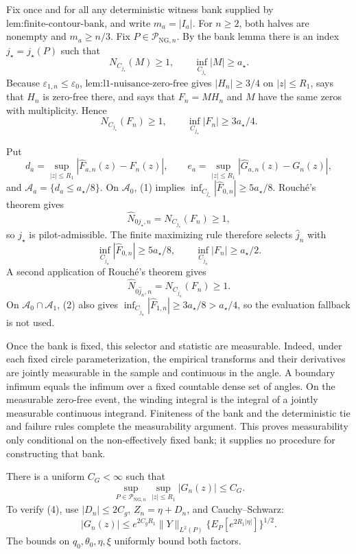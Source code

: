 Fix once and for all any deterministic witness bank supplied by \(\text{lem:finite-contour-bank}\), and write \(m_a=|I_a|\).  For \(n\ge2\), both halves are nonempty and \(m_a\ge n/3\).  Fix \(P\in\mathcal P_{\mathrm{NG},n}\).  By the bank lemma there is an index \(j_\star=j_\star(P)\) such that
\[
 N_{C_{j_\star}}(M)\ge1,
 \qquad \inf_{C_{j_\star}}|M|\ge a_\star.
\]
Because \(\varepsilon_{1,n}\le\varepsilon_0\), \(\text{lem:l1-nuisance-zero-free}\) gives \(|H_n|\ge3/4\) on \(|z|\le R_1\), says that \(H_n\) is zero-free there, and says that \(F_n=M H_n\) and \(M\) have the same zeros with multiplicity.  Hence
\[
 N_{C_{j_\star}}(F_n)\ge1,
 \qquad \inf_{C_{j_\star}}|F_n|\ge3a_\star/4. \tag{1}
\]

Put
\[
 d_a=\sup_{|z|\le R_1}|\widehat F_{a,n}(z)-F_n(z)|,
 \qquad
 e_a=\sup_{|z|\le R_1}|\widehat G_{a,n}(z)-G_n(z)|,
\]
and \(\mathcal A_a=\{d_a\le a_\star/8\}\).  On \(\mathcal A_0\), (1) implies \(\inf_{C_{j_\star}}|\widehat F_{0,n}|\ge5a_\star/8\).  Rouch\'e's theorem gives
\[
 \widehat N_{0j_\star,n}=N_{C_{j_\star}}(F_n)\ge1,
\]
so \(j_\star\) is pilot-admissible.  The finite maximizing rule therefore selects \(\widehat j_n\) with
\[
 \inf_{C_{\widehat j_n}}|\widehat F_{0,n}|\ge5a_\star/8,
 \qquad
 \inf_{C_{\widehat j_n}}|F_n|\ge a_\star/2. \tag{2}
\]
A second application of Rouch\'e's theorem gives
\[
 \widehat N_{0\widehat j_n,n}=N_{C_{\widehat j_n}}(F_n)\ge1. \tag{3}
\]
On \(\mathcal A_0\cap\mathcal A_1\), (2) also gives \(\inf_{C_{\widehat j_n}}|\widehat F_{1,n}|\ge3a_\star/8>a_\star/4\), so the evaluation fallback is not used.

Once the bank is fixed, this selector and statistic are measurable.  Indeed, under each fixed circle parameterization, the empirical transforms and their derivatives are jointly measurable in the sample and continuous in the angle.  A boundary infimum equals the infimum over a fixed countable dense set of angles.  On the measurable zero-free event, the winding integral is the integral of a jointly measurable continuous integrand.  Finiteness of the bank and the deterministic tie and failure rules complete the measurability argument.  This proves measurability only conditional on the non-effectively fixed bank; it supplies no procedure for constructing that bank.

There is a uniform \(C_G<\infty\) such that
\[
 \sup_{P\in\mathcal P_{\mathrm{NG},n}}\sup_{|z|\le R_1}|G_n(z)|\le C_G. \tag{4}
\]
To verify (4), use \(|D_n|\le2C_g\), \(Z_n=\eta+D_n\), and Cauchy--Schwarz:
\[
 |G_n(z)|\le e^{2C_gR_1}\|Y\|_{L^2(P)}
 \{E_P[e^{2R_1|\eta|}]\}^{1/2}.
\]
The bounds on \(q_0,\theta_0,\eta,\xi\) uniformly bound both factors.

